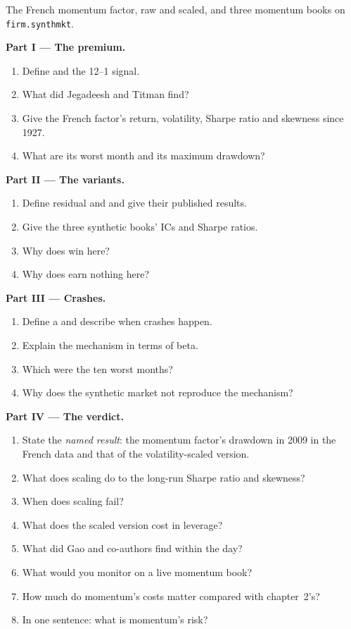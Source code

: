 \begin{problem}\label{pb:s1:momentum:1}
The French momentum factor, raw and scaled, and three momentum books on \texttt{firm.synthmkt}.

\medskip\noindent\textbf{Part I --- The premium.}
\begin{enumerate}
\item Define  and the 12--1 signal.
\item What did Jegadeesh and Titman find?
\item Give the French factor's return, volatility, Sharpe ratio and skewness since 1927.
\item What are its worst month and its maximum drawdown?
\end{enumerate}

\medskip\noindent\textbf{Part II --- The variants.}
\begin{enumerate}[resume]
\item Define residual and  and give their published results.
\item Give the three synthetic books' ICs and Sharpe ratios.
\item Why does  win here?
\item Why does  earn nothing here?
\end{enumerate}

\medskip\noindent\textbf{Part III --- Crashes.}
\begin{enumerate}[resume]
\item Define a  and describe when crashes happen.
\item Explain the mechanism in terms of beta.
\item Which were the ten worst months?
\item Why does the synthetic market not reproduce the mechanism?
\end{enumerate}

\medskip\noindent\textbf{Part IV --- The verdict.}
\begin{enumerate}[resume]
\item State the \emph{named result}: the momentum factor's drawdown in 2009 in the French data and that of the volatility-scaled version.
\item What does scaling do to the long-run Sharpe ratio and skewness?
\item When does scaling fail?
\item What does the scaled version cost in leverage?
\item What did Gao and co-authors find within the day?
\item What would you monitor on a live momentum book?
\item How much do momentum's costs matter compared with chapter~2's?
\item In one sentence: what is momentum's risk?
\end{enumerate}
\end{problem}

